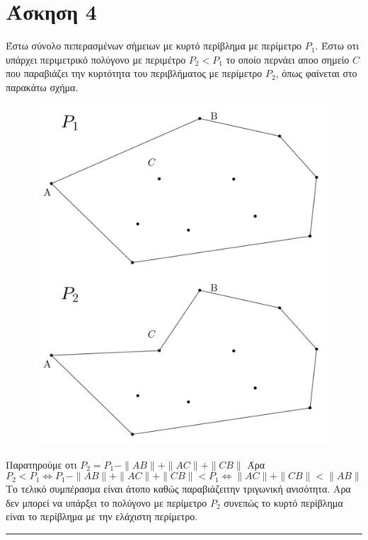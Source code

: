 \documentclass[12pt]{article}
\begin{document}
\section*{Άσκηση 4}
Έστω σύνολο πεπερασμένων σήμειων με κυρτό περίβλημα με περίμετρο $P_1$. Έστω οτι υπάρχει περιμετρικό πολύγονο με περιμέτρο $P_2<P_1$ το οποίο περνάει αποο σημείο $C$ που παραβιάζει την κυρτότητα του περιβλήματος με περίμετρο $P_2$, όπως φαίνεται στο παρακάτω σχήμα.
\begin{figure}[H]

    \centering
    \includegraphics[scale = 1.1]{ge8.png}
    \includegraphics[scale =1.1]{ge7.png}
\end{figure} 
Παρατηρούμε οτι $P_2 = P_1 - \|AB\| + \|AC\| + \|CB\|$ Άρα 
$$ P_2<P_1 \Leftrightarrow P_1 - \|AB\| + \|AC\| + \|CB\| <P_1\Leftrightarrow \|AC\| + \|CB\|< \|AB\|$$
Το τελικό συμπέρασμα είναι άτοπο καθώς παραβιάζειτην τριγωνική ανισότητα. Αρα δεν μπορεί να υπάρξει το πολύγονο με περίμετρο $P_2$ συνεπώς το κυρτό περίβλημα είναι το περίβλημα με την ελάχιστη περίμετρο.\\
\rule{\textwidth}{.5pt}
\end{document}

